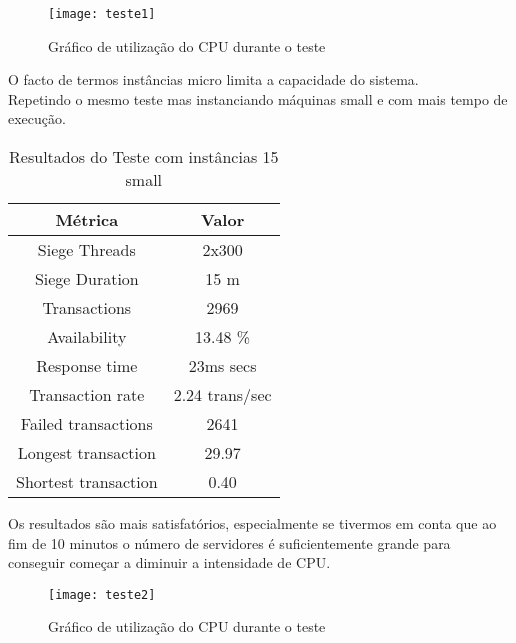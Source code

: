 \begin{figure}[htb]
\centering
\texttt{[image: teste1]}
\caption{Gráfico de utilização do CPU durante o teste}
\label{fig:teste1CPU}
\end{figure}

O facto de termos instâncias micro limita a capacidade do sistema.\\
Repetindo o mesmo teste mas instanciando máquinas small e com mais tempo de execução.
\begin{table}[ht]
\centering
\begin{tabular}{| c | c |}
    \hline
    {\bf Métrica} &  {\bf Valor} \\ \hline
	Siege  Threads 		&  2x300  \\ \hline
	Siege  Duration 	&  15 m \\ \hline\hline
	Transactions 		& 2969  \\ \hline
	Availability 		&  13.48 \%  \\ \hline
	Response time 		&  23ms secs  \\ \hline
	Transaction rate 	&  2.24 trans/sec \\ \hline
	Failed transactions &  2641 \\ \hline
	Longest transaction &  29.97 \\ \hline
	Shortest transaction &  0.40 \\ \hline
  \end{tabular}
\caption{Resultados do Teste com instâncias 15 small}
\end{table}

Os resultados são mais satisfatórios, especialmente se tivermos em conta que ao fim de 10 minutos o número de servidores é suficientemente grande para conseguir começar a diminuir a intensidade de CPU.\\
\begin{figure}[htb]
\centering
\texttt{[image: teste2]}
\caption{Gráfico de utilização do CPU durante o teste}
\label{fig:teste2}
\end{figure}

